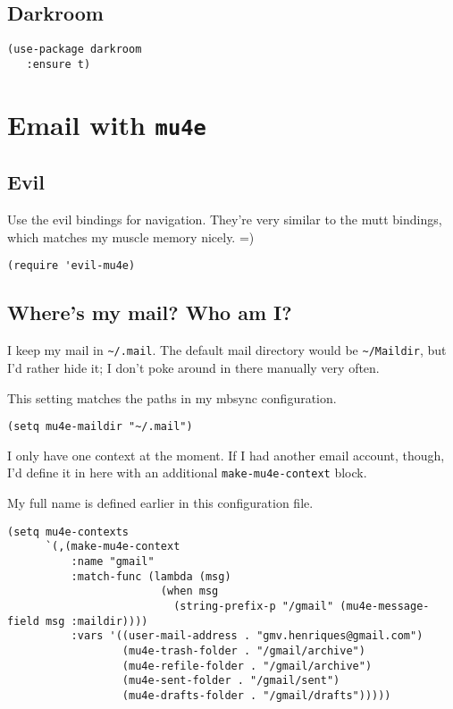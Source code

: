\documentclass[11pt]{article}
\begin{document}
\subsection{Darkroom}
\label{sec:org742df63}

\begin{verbatim}
(use-package darkroom
   :ensure t)
\end{verbatim}

\section{Email with \texttt{mu4e}}
\label{sec:orgb5eb1ee}
\subsection{Evil}
\label{sec:orgb06f316}
Use the evil bindings for navigation. They’re very similar to the mutt bindings,
which matches my muscle memory nicely. =)

\begin{verbatim}
(require 'evil-mu4e)
\end{verbatim}
\subsection{Where’s my mail? Who am I?}
\label{sec:org31cec0f}
I keep my mail in \texttt{\textasciitilde{}/.mail}. The default mail directory would be \texttt{\textasciitilde{}/Maildir}, but I’d rather hide it; I don’t poke around in there manually very often.

This setting matches the paths in my mbsync configuration.

\begin{verbatim}
(setq mu4e-maildir "~/.mail")
\end{verbatim}

I only have one context at the moment. If I had another email account, though,
I’d define it in here with an additional \texttt{make-mu4e-context} block.

My full name is defined earlier in this configuration file.

\begin{verbatim}
(setq mu4e-contexts
      `(,(make-mu4e-context
          :name "gmail"
          :match-func (lambda (msg)
                        (when msg
                          (string-prefix-p "/gmail" (mu4e-message-field msg :maildir))))
          :vars '((user-mail-address . "gmv.henriques@gmail.com")
                  (mu4e-trash-folder . "/gmail/archive")
                  (mu4e-refile-folder . "/gmail/archive")
                  (mu4e-sent-folder . "/gmail/sent")
                  (mu4e-drafts-folder . "/gmail/drafts")))))
\end{verbatim}
\end{document}
